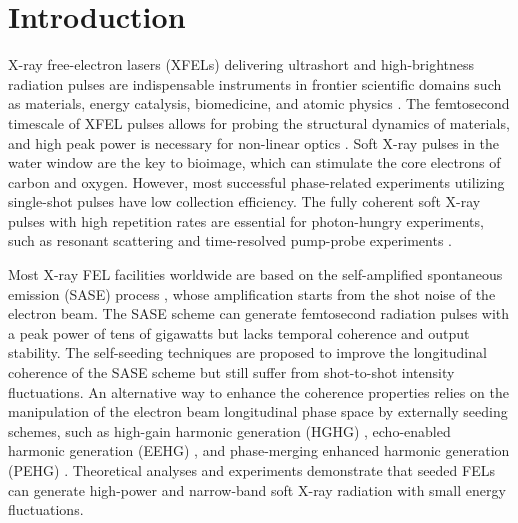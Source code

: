 \documentclass[%
 reprint,
 amsmath,amssymb,
 aps,
]{revtex4-2}
\begin{document}
\maketitle


\section{\label{sec:1}Introduction}
X-ray free-electron lasers (XFELs) delivering ultrashort and high-brightness radiation pulses are indispensable instruments in frontier scientific domains such as materials, energy catalysis, biomedicine, and atomic physics \citep{Huang2021}. The femtosecond timescale of XFEL pulses allows for probing the structural dynamics of materials, and high peak power is necessary for non-linear optics \citep{Schreck2015}. Soft X-ray pulses in the water window are the key to bioimage, which can stimulate the core electrons of carbon and oxygen. However, most successful phase-related experiments utilizing single-shot pulses have low collection efficiency. The fully coherent soft X-ray pulses with high repetition rates are essential for photon-hungry experiments, such as resonant scattering and time-resolved pump-probe experiments \citep{Schaper2021}.

Most X-ray FEL facilities worldwide are based on the self-amplified spontaneous emission (SASE) process \citep{Kondratenko1980}, whose amplification starts from the shot noise of the electron beam. The SASE scheme can generate femtosecond radiation pulses with a peak power of tens of gigawatts but lacks temporal coherence and output stability. The self-seeding techniques \citep{Gianluca2011} are proposed to improve the longitudinal coherence of the SASE scheme but still suffer from shot-to-shot intensity fluctuations. An alternative way to enhance the coherence properties relies on the manipulation of the electron beam longitudinal phase space by externally seeding schemes, such as high-gain harmonic generation (HGHG) \citep{Yu1991}, echo-enabled harmonic generation (EEHG) \citep{Stupakov2009}, and phase-merging enhanced harmonic generation (PEHG) \citep{Deng2013}. Theoretical analyses and experiments demonstrate that seeded FELs can generate high-power and narrow-band soft X-ray radiation with small energy fluctuations.
\end{document}
